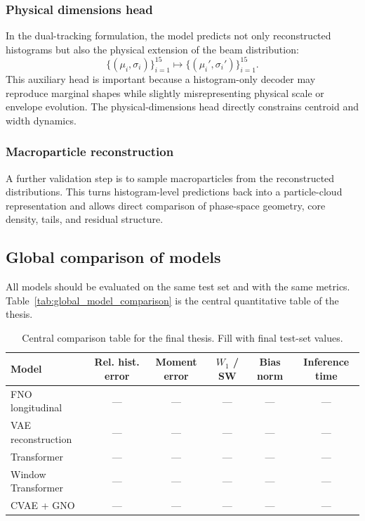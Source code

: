 \subsubsection{Physical dimensions head}
In the dual-tracking formulation, the model predicts not only reconstructed histograms but also the physical extension of the beam distribution:
\begin{equation}
    \big\{(\mu_i,\sigma_i)\big\}_{i=1}^{15}\mapsto \big\{(\mu_i',\sigma_i')\big\}_{i=1}^{15}.
\end{equation}
This auxiliary head is important because a histogram-only decoder may reproduce marginal shapes while slightly misrepresenting physical scale or envelope evolution. The physical-dimensions head directly constrains centroid and width dynamics.


\subsubsection{Macroparticle reconstruction}
A further validation step is to sample macroparticles from the reconstructed distributions. This turns histogram-level predictions back into a particle-cloud representation and allows direct comparison of phase-space geometry, core density, tails, and residual structure.


\subsection{Global comparison of models}
All models should be evaluated on the same test set and with the same metrics. Table~\ref{tab:global_model_comparison} is the central quantitative table of the thesis.

\begin{table}[H]
\centering
\caption{Central comparison table for the final thesis. Fill with final test-set values.}
\label{tab:global_model_comparison_summary}
\begin{tabular}{lccccc}
\toprule
Model & Rel. hist. error & Moment error & $W_1$ / SW & Bias norm & Inference time \\
\midrule
FNO longitudinal & --- & --- & --- & --- & --- \\
VAE reconstruction & --- & --- & --- & --- & --- \\
Transformer & --- & --- & --- & --- & --- \\
Window Transformer & --- & --- & --- & --- & --- \\
CVAE + GNO & --- & --- & --- & --- & --- \\
\bottomrule
\end{tabular}
\end{table}


